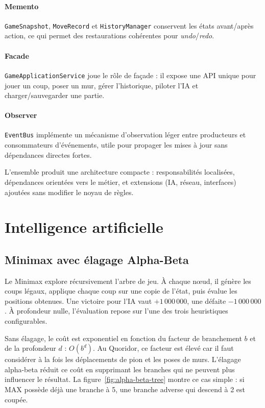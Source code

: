 \documentclass[a4paper]{article}
\begin{document}
\paragraph{Memento}
\texttt{GameSnapshot}, \texttt{MoveRecord} et \texttt{HistoryManager}
conservent les états avant/après action, ce qui permet des restaurations
cohérentes pour \emph{undo}/\emph{redo}.

\paragraph{Facade}
\texttt{GameApplicationService} joue le rôle de façade : il expose une API
unique pour jouer un coup, poser un mur, gérer l'historique, piloter l'IA et
charger/sauvegarder une partie.

\paragraph{Observer}
\texttt{EventBus} implémente un mécanisme d'observation léger entre producteurs
et consommateurs d'événements, utile pour propager les mises à jour sans
dépendances directes fortes.

L'ensemble produit une architecture compacte : responsabilités localisées,
dépendances orientées vers le métier, et extensions (IA, réseau, interfaces)
ajoutées sans modifier le noyau de règles.

\section{Intelligence artificielle}
\subsection{Minimax avec élagage Alpha-Beta}

Le Minimax explore récursivement l'arbre de jeu. À chaque nœud, il génère les
coups légaux, applique chaque coup sur une copie de l'état, puis évalue les
positions obtenues. Une victoire pour l'IA vaut $+1\,000\,000$, une défaite
$-1\,000\,000$. À profondeur nulle, l'évaluation repose sur l'une des trois
heuristiques configurables.

Sans élagage, le coût est exponentiel en fonction du facteur de branchement
$b$ et de la profondeur $d$ : $O(b^d)$. Au Quoridor, ce facteur est élevé car
il faut considérer à la fois les déplacements de pion et les poses de murs.
L'élagage alpha-beta réduit ce coût en supprimant les branches qui ne peuvent
plus influencer le résultat. La figure~\ref{fig:alpha-beta-tree} montre ce cas
simple : si MAX possède déjà une branche à 5, une branche adverse qui descend
à 2 est coupée.
\end{document}
